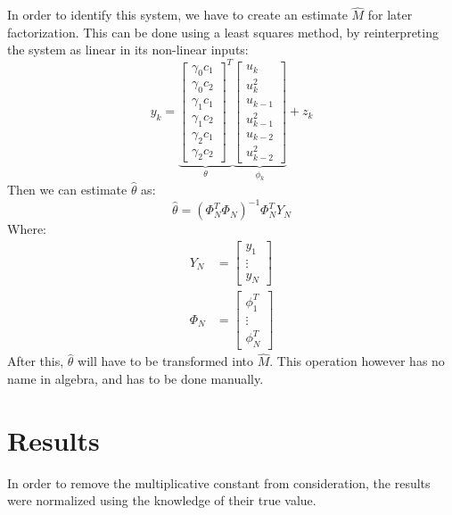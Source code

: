In order to identify this system, we have to create an estimate $\hat{M}$ for later factorization. This can be done using a least squares method, by reinterpreting the system as linear in its non-linear inputs:
\begin{equation}
y_k = \underbrace{\begin{bmatrix}
        \gamma_0c_1 \\ \gamma_0c_2 \\\gamma_1c_1 \\ \gamma_1c_2 \\ \gamma_2c_1 \\ \gamma_2 c_2
    \end{bmatrix}^{T}}_{\theta} \underbrace{\begin{bmatrix}
    u_k \\ u_k^{2} \\u_{k-1} \\ u_{k-1}^{2} \\ u_{k-2} \\ u_{k-2}^{2}
\end{bmatrix}}_{\phi_k} + z_k
\end{equation}
Then we can estimate $\hat{\theta}$ as:
 \begin{equation}
     \hat{\theta} = (\Phi_N^{T}\Phi_N)^{-1}\Phi^{T}_NY_N
\end{equation}
Where:
\begin{equation}
    \begin{aligned}
        Y_N &= \begin{bmatrix}
            y_1 \\ \vdots \\ y_N
        \end{bmatrix}\\
            \Phi_N &= \begin{bmatrix}
            \phi_1^{T} \\ \vdots \\ \phi_N^{T}
        \end{bmatrix}
        
    \end{aligned}
\end{equation}
After this, $\hat{\theta}$ will have to be transformed into $\hat{M}$. This operation however has no name in algebra, and has to be done manually.
\clearpage
\section{Results}
In order to remove the multiplicative constant from consideration, the results were normalized using the knowledge of their true value.

